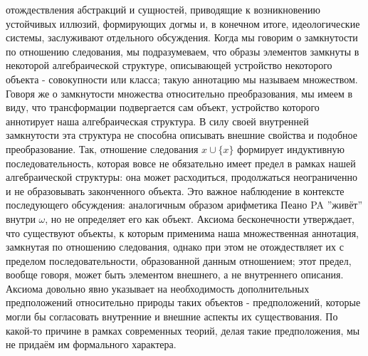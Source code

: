 \documentclass[12pt]{article}
\begin{document}
отождествления абстракций и сущностей, приводящие к возникновению устойчивых иллюзий, формирующих догмы и, в конечном итоге, идеологические системы, заслуживают отдельного обсуждения. Когда мы говорим о замкнутости по отношению следования, мы подразумеваем, что образы элементов замкнуты в некоторой алгебраической структуре, описывающей устройство некоторого объекта - совокупности или класса; такую аннотацию мы называем множеством. Говоря же о замкнутости множества относительно преобразования, мы имеем в виду, что трансформации подвергается сам объект, устройство которого аннотирует наша алгебраическая структура. В силу своей внутренней замкнутости эта структура не способна описывать внешние свойства и подобное преобразование. Так, отношение следования $x \cup \{ x \}$ формирует индуктивную последовательность, которая вовсе не обязательно имеет предел в рамках нашей алгебраической структуры: она может расходиться, продолжаться неограниченно и не образовывать законченного объекта. Это важное наблюдение в контексте последующего обсуждения: аналогичным образом арифметика Пеано PA ''живёт'' внутри $\omega$, но не определяет его как объект. Аксиома бесконечности утверждает, что существуют объекты, к которым применима наша множественная аннотация, замкнутая по отношению следования, однако при этом не отождествляет их с пределом последовательности, образованной данным отношением; этот предел, вообще говоря, может быть элементом внешнего, а не внутреннего описания. Аксиома довольно явно указывает на необходимость дополнительных предположений относительно природы таких объектов - предположений, которые могли бы согласовать внутренние и внешние аспекты их существования. По какой-то причине в рамках современных теорий, делая такие предположения, мы не придаём им формального характера.
\end{document}
